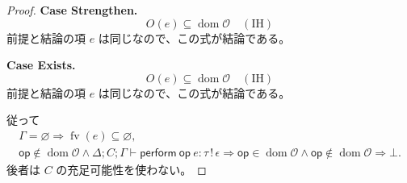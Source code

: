 \documentclass[a4paper,11pt]{article}
\theoremstyle{definition}
\newenvironment{Case}[1]{\par\smallskip\noindent\textbf{Case #1.}\enspace\ignorespaces}{\par}
\newcommand{\FV}{\operatorname{fv}}
\newcommand{\dom}{\operatorname{dom}}
\newcommand{\op}{\mathsf{op}}
\newcommand{\ops}{\mathcal O}
\newcommand{\emp}{\varnothing}
\newcommand{\jj}[6]{#1;#2;#3\vdash #4:#5\,!\,#6}
\newcommand{\J}[3]{\jj{\Delta}{C}{\Gamma}{#1}{#2}{#3}}
\newcommand{\perform}[2]{\mathsf{perform}\ #1\ #2}
\begin{document}
\begin{proof}
\begin{Case}{Strengthen}
\[O(e)\subseteq\dom\ops\quad(\mathrm{IH})\]
前提と結論の項 $e$ は同じなので、この式が結論である。
\end{Case}

\begin{Case}{Exists}
\[O(e)\subseteq\dom\ops\quad(\mathrm{IH})\]
前提と結論の項 $e$ は同じなので、この式が結論である。
\end{Case}
従って
\begin{gather*}
 \Gamma=\emp\Rightarrow\FV(e)\subseteq\emp,\\
 \op\notin\dom\ops\land\J{\perform\op e}\tau\epsilon
 \Rightarrow\op\in\dom\ops\land\op\notin\dom\ops\Rightarrow\bot.
\end{gather*}
後者は $C$ の充足可能性を使わない。
\end{proof}
\end{document}
